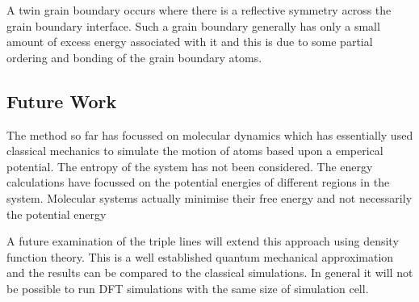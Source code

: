 \documentclass[12pt,a4paper]{book}
\begin{document}
A twin grain boundary occurs where there is a reflective symmetry across the grain boundary interface. Such a grain boundary generally has only a small amount of excess energy associated with it and this is due to some partial ordering and bonding of the grain boundary atoms.

\subsection{Future Work}

The method so far has focussed on molecular dynamics which has essentially used classical mechanics to simulate the motion of atoms based upon a emperical potential. The entropy of the system has not been considered. The energy calculations have focussed on the potential energies of different regions in the system. Molecular systems actually minimise their free energy and not necessarily the potential energy 

A future examination of the triple lines will extend this approach using density function theory. This is a well established quantum mechanical approximation and the results can be compared to the classical simulations. In general it will not be possible to run DFT simulations with the same size of simulation cell.  
 
\end{document}
